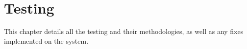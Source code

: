 
\chapter{Testing}\label{chapter:methodology}

This chapter details all the testing and their methodologies, as well as any
fixes implemented on the system.

\clearpage

\clearpage

\clearpage

\clearpage



